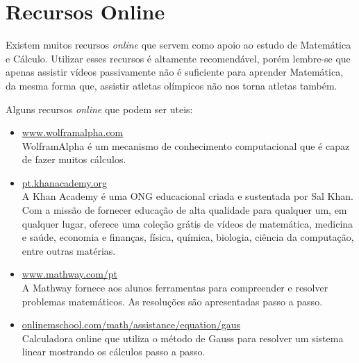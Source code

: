 \section{Recursos Online}

Existem muitos recursos \textit{online} que servem como apoio ao estudo de Matemática e Cálculo. 
Utilizar esses recursos é altamente recomendável, porém lembre-se que apenas assistir vídeos passivamente
não é suficiente para aprender Matemática, da mesma forma que, assistir atletas olímpicos não nos torna 
atletas também. 

Alguns recursos \textit{online} que podem ser uteis:
\begin{itemize}
    \item \href{http://www.wolframalpha.com}{www.wolframalpha.com} \\
         WolframAlpha é um mecanismo de conhecimento computacional que é capaz de fazer muitos cálculos.
         
    \item \href{http://pt.khanacademy.org}{pt.khanacademy.org} \\
        A Khan Academy é uma ONG educacional criada e sustentada por Sal Khan. 
        Com a missão de fornecer educação de alta qualidade para qualquer um, em qualquer lugar, 
        oferece uma coleção grátis de vídeos de matemática, medicina e saúde, economia e finanças, 
        física, química, biologia, ciência da computação, entre outras matérias.
        
    \item \href{http://www.mathway.com/pt}{www.mathway.com/pt} \\
        A Mathway fornece aos alunos ferramentas para compreender e resolver problemas matemáticos. 
        As resoluções são apresentadas passo a passo.
        
    \item \href{http://onlinemschool.com/math/assistance/equation/gaus}{onlinemschool.com/math/assistance/equation/gaus} \\
        Calculadora online que utiliza o método de Gauss para resolver um sistema linear mostrando os cálculos passo a passo.
\end{itemize}



